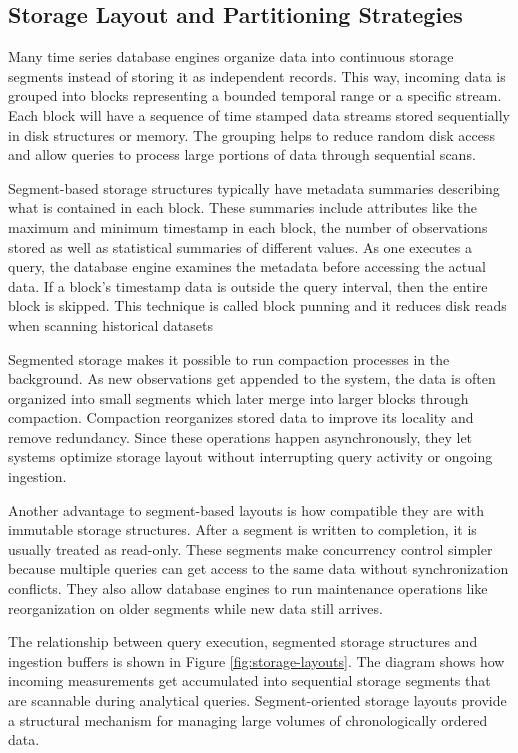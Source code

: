 \subsection{Storage Layout and Partitioning Strategies}
Many time series database engines organize data into continuous storage segments instead of storing it as independent records. This way, incoming data is grouped into blocks representing a bounded temporal range or a specific stream. Each block will have a sequence of time stamped data streams stored sequentially in disk structures or memory. The grouping helps to reduce random disk access and allow queries to process large portions of data through sequential scans. 

Segment-based storage structures typically have metadata summaries describing what is contained in each block. These summaries include attributes like the maximum and minimum timestamp in each block, the number of observations stored as well as statistical summaries of different values. As one executes a query, the database engine examines the metadata before accessing the actual data. If a block’s timestamp data is outside the query interval, then the entire block is skipped. This technique is called block punning and it reduces disk reads when scanning historical datasets

Segmented storage makes it possible to run compaction processes in the background. As new observations get appended to the system, the data is often organized into small segments which later merge into larger blocks through compaction. Compaction reorganizes stored data to improve its locality and remove redundancy. Since these operations happen asynchronously, they let systems optimize storage layout without interrupting query activity or ongoing ingestion. 

Another advantage to segment-based layouts is how compatible they are with immutable storage structures. After a segment is written to completion, it is usually treated as read-only. These segments make concurrency control simpler because multiple queries can get access to the same data without synchronization conflicts. They also allow database engines to run maintenance operations like reorganization on older segments while new data still arrives. 




The relationship between query execution, segmented storage structures and ingestion buffers is shown in Figure \ref{fig:storage-layouts}. The diagram shows how incoming measurements get accumulated into sequential storage segments that are scannable during analytical queries. Segment-oriented storage layouts provide a structural mechanism for managing large volumes of chronologically ordered data. 


